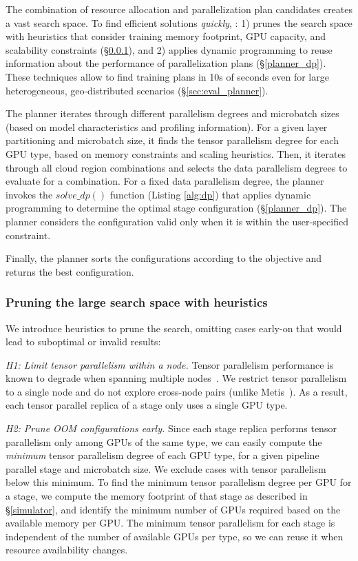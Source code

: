 The combination of resource allocation and parallelization plan candidates creates a vast search space. To find efficient solutions \textit{quickly}, \sailor: 1) prunes the search space with heuristics that consider training memory footprint, GPU capacity, and scalability constraints (\S\ref{planner_heuristics}), and 2) applies dynamic programming to reuse information about the performance of parallelization plans (\S\ref{planner_dp}). These techniques allow \sailor to find training plans in 10s of seconds even for large heterogeneous, geo-distributed scenarios (\S\ref{sec:eval_planner}). 

The planner iterates through different parallelism degrees and microbatch sizes (based on model characteristics and profiling information). For a given layer partitioning and microbatch size, it finds the tensor parallelism degree for each GPU type, based on memory constraints and scaling heuristics. Then, it iterates through all cloud region combinations and selects the data parallelism degrees to evaluate for a combination. For a fixed data parallelism degree, the planner invokes the $solve\_dp()$ function (Listing \ref{alg:dp}) that applies dynamic programming to determine the optimal stage configuration (\S \ref{planner_dp}). The planner considers the configuration valid only when it is within the user-specified constraint.

Finally, the planner sorts the configurations according to the objective and returns the best configuration.


\subsubsection{Pruning the large search space with heuristics}\label{planner_heuristics} We introduce heuristics to prune the search, omitting cases early-on that would lead to suboptimal or invalid results:

\textit{H1: Limit tensor parallelism within a node.}\label{H1} Tensor parallelism performance is known to degrade when spanning multiple nodes~\cite{shoeybi2020megatronlm, strati2024dejavu}. We restrict tensor parallelism to a single node and do not explore cross-node pairs (unlike Metis~\cite{Um24Metis}). As a result, each tensor parallel replica of a stage only uses a single GPU type.

\textit{H2: Prune OOM configurations early.}  Since each stage replica performs tensor parallelism only among GPUs of the same type, we can easily compute the \textit{minimum} tensor parallelism degree of each GPU type, for a given pipeline parallel stage and microbatch size. We exclude cases with tensor parallelism below this minimum. To find the minimum tensor parallelism degree per GPU for a stage, we compute the memory footprint of that stage as described in \S\ref{simulator}, and identify the minimum number of GPUs required based on the available memory per GPU. The minimum tensor parallelism for each stage is independent of the number of available GPUs per type, so we can reuse it when resource availability changes.

